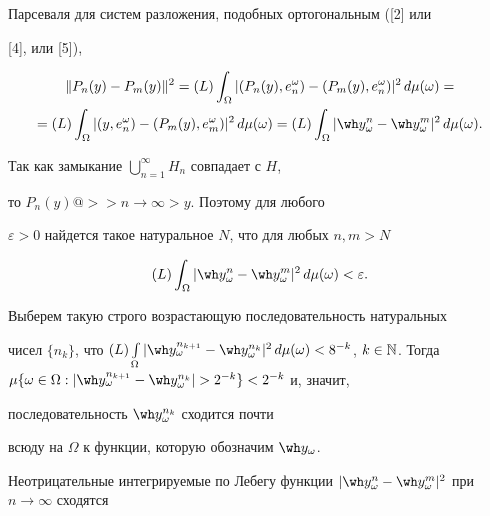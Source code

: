 Парсеваля для систем разложения, подобных ортогональным ([2] или


[4], или [5]),


\begin{multline*}


\|P_n(y)-P_m(y)\|^2=(L)\int_\Omega|(


P_n(y),e^\omega_n)-(P_m(y),e^\omega_n)|^2\,d\mu(\omega)= \\


%


=(L)\int_\Omega|(y,e^\omega_n)-(P_m(y),e^\omega_m)|^2


\,d\mu(\omega)=(L)\int_\Omega|\wh y^n_\omega


-\wh y^m_\omega|^2\,d\mu(\omega).


\end{multline*}





Так как замыкание $\bigcup_{n=1}^\infty H_n$ совпадает с $H$,


то $P_n(y)@>>{n\to\infty}>y$. Поэтому для любого


$\varepsilon>0$ найдется такое натуральное $N$, что для любых $n,m>N$


\begin{equation}


(L)\int_\Omega|\wh y^n_\omega-\wh y^m_\omega


|^2\,d\mu(\omega)<\varepsilon.


\end{equation}





Выберем такую строго возрастающую последовательность натуральных


чисел $\{n_k\}$, что $(L)\int\limits_\Omega|\wh y_\omega^{n_{k+1}}


-\wh y_\omega^{n_k}|^2\,d\mu(\omega )<8^{-k}$, $k\in\Bbb


N$. Тогда $\mu\{\omega\in\Omega: |\wh y^{n_{k+1}}_\omega


-\wh y^{n_k}_\omega|>2^{-k}\}<2^{-k}$ и, значит,


последовательность $\wh y^{n_k}_\omega$ сходится почти


всюду на $\Omega$ к функции, которую обозначим $\wh y_\omega$.


Неотрицательные интегрируемые по Лебегу функции $|\wh


y^n_\omega-\wh y^m_\omega|^2$ при $n\to\infty$ сходятся


